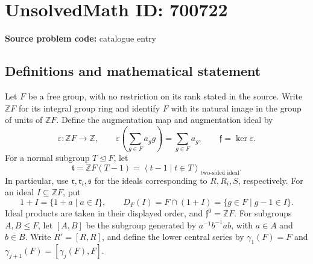 \documentclass[11pt]{article}
\newcommand{\Z}{\mathbb{Z}}
\begin{document}
\section*{UnsolvedMath ID: 700722}
\textbf{Source problem code:} catalogue entry
\subsection{Definitions and mathematical statement}
Let \(F\) be a free group, with no restriction on its rank stated in the source. Write \(\Z F\) for its integral group ring and identify \(F\) with its natural image in the group of units of \(\Z F\). Define the augmentation map and augmentation ideal by
\[
\varepsilon:\Z F\longrightarrow\Z,\qquad
\varepsilon\!\left(\sum_{g\in F}a_g g\right)=\sum_{g\in F}a_g,
\qquad \mathfrak f=\ker\varepsilon.
\]
For a normal subgroup \(T\trianglelefteq F\), let
\[
\mathfrak t=\Z F(T-1)=\left\langle t-1\mid t\in T\right\rangle_{\text{two-sided ideal}}.
\]
In particular, use \(\mathfrak r,\mathfrak r_i,\mathfrak s\) for the ideals corresponding to \(R,R_i,S\), respectively. For an ideal \(I\subseteq\Z F\), put
\[
1+I=\{1+a\mid a\in I\},\qquad
D_F(I)=F\cap(1+I)=\{g\in F\mid g-1\in I\}.
\]
Ideal products are taken in their displayed order, and \(\mathfrak f^0=\Z F\). For subgroups \(A,B\leq F\), let \([A,B]\) be the subgroup generated by \(a^{-1}b^{-1}ab\), with \(a\in A\) and \(b\in B\). Write \(R'=[R,R]\), and define the lower central series by \(\gamma_1(F)=F\) and \(\gamma_{j+1}(F)=[\gamma_j(F),F]\).
\end{document}
